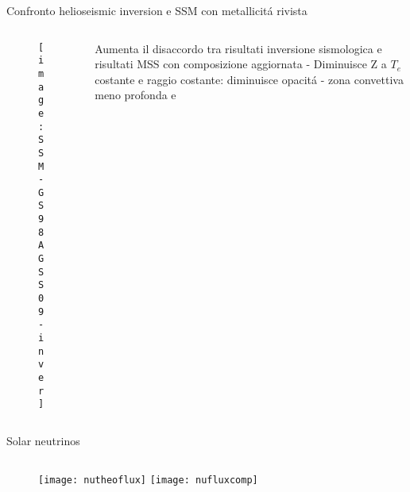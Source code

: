 \begin{frame}{Confronto helioseismic inversion e SSM con metallicit\'a rivista}
\begin{columns}[T]
	\begin{column}{0.5\textwidth}
		\begin{figure}[!ht]%
			\texttt{[image: SSM-GS98AGSS09-inver]}
		\end{figure}
	\end{column}
	\begin{column}{0.5\textwidth}
Aumenta il disaccordo tra risultati inversione sismologica e risultati MSS con composizione aggiornata - Diminuisce Z a $T_e$ costante e raggio costante: diminuisce opacit\'a - zona convettiva meno profonda e 
	\end{column}
\end{columns}
\end{frame}

\begin{frame}{Solar neutrinos}
\begin{columns}[T]
	\begin{column}{0.5\textwidth}
		\begin{figure}[!ht]%
			\texttt{[image: nutheoflux]}
				\texttt{[image: nufluxcomp]}
		\end{figure}
	\end{column}
	\begin{column}{0.5\textwidth}

	\end{column}
\end{columns}
\end{frame}
